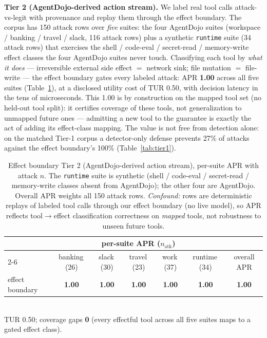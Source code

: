 \documentclass[11pt]{article}
\newcommand{\good}[1]{\textcolor{good}{\textbf{#1}}}
\newcommand{\code}[1]{\texttt{\small #1}}
\begin{document}
\textbf{Tier 2 (AgentDojo-derived action stream).} We label real tool calls attack-vs-legit with
provenance and replay them through the effect boundary. The corpus has 150 attack rows over
\emph{five} suites: the four AgentDojo suites (workspace / banking / travel / slack, 116 attack
rows) plus a synthetic \code{runtime} suite (34 attack rows) that exercises the shell / code-eval /
secret-read / memory-write effect classes the four AgentDojo suites never touch. Classifying each
tool by \emph{what it does} --- irreversible external side effect $=$ network sink; file mutation
$=$ file-write --- the effect boundary gates every labeled attack: APR \good{1.00} across all five
suites (Table~\ref{tab:tier2}), at a disclosed utility cost of TUR 0.50, with decision latency in
the tens of microseconds. This 1.00 is by construction on the mapped tool set (no held-out tool
split): it certifies coverage of these tools, not generalization to unmapped future ones ---
admitting a new tool to the guarantee is exactly the act of adding its effect-class mapping. The
value is not free from detection alone: on the matched Tier-1 corpus a detector-only defense
prevents 27\% of attacks against the effect boundary's 100\% (Table~\ref{tab:tier1}).

\begin{table}[htbp]\centering\small
\setlength\tabcolsep{5pt}
\caption{Effect boundary Tier 2 (AgentDojo-derived action stream), per-suite APR with attack $n$.
The \code{runtime} suite is synthetic (shell / code-eval / secret-read / memory-write classes absent
from AgentDojo); the other four are AgentDojo. Overall APR weights all 150 attack rows.
\emph{Confound:} rows are deterministic replays of labeled tool calls through our effect boundary
(no live model), so APR reflects tool$\to$effect classification correctness on \emph{mapped} tools,
not robustness to unseen future tools.}\label{tab:tier2}
\begin{tabular}{lcccccc}
\toprule
 & \multicolumn{5}{c}{per-suite APR ($n_{\text{atk}}$)} & \\
\cmidrule(lr){2-6}
 & banking\,(26) & slack\,(30) & travel\,(23) & work\,(37) & runtime\,(34) & overall APR \\
\midrule
effect boundary & \good{1.00} & \good{1.00} & \good{1.00} & \good{1.00} & \good{1.00} & \good{1.00} \\
\bottomrule
\end{tabular}\\[2pt]
{\footnotesize TUR 0.50; coverage gaps \good{0} (every effectful tool across all five suites maps to
a gated effect class).}
\end{table}
\end{document}
